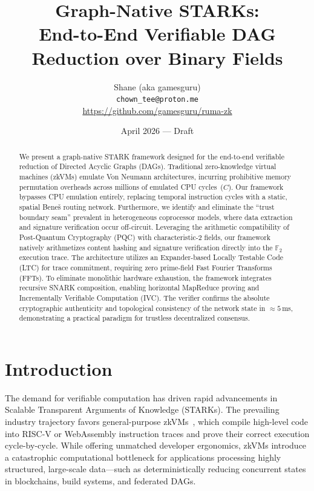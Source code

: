 \documentclass[11pt,a4paper]{article}
\title{%
  \textbf{Graph-Native STARKs:}\\
  End-to-End Verifiable DAG Reduction over Binary Fields
}
\author{%
  Shane (aka gamesguru)\\
  \texttt{chown\_tee@proton.me}\\
  \url{https://github.com/gamesguru/ruma-zk}
}
\date{April 2026 --- Draft}
\begin{document}
\maketitle

\begin{abstract}
We present a graph-native STARK framework designed for the
end-to-end verifiable reduction of Directed Acyclic Graphs (DAGs).
Traditional zero-knowledge virtual machines (zkVMs) emulate Von
Neumann architectures, incurring prohibitive memory permutation
overheads across millions of emulated CPU cycles~($C$).  Our
framework bypasses CPU emulation entirely, replacing temporal
instruction cycles with a static, spatial Bene\v{s} routing
network.  Furthermore, we identify and eliminate the ``trust
boundary seam'' prevalent in heterogeneous coprocessor models,
where data extraction and signature verification occur off-circuit.
Leveraging the arithmetic compatibility of Post-Quantum
Cryptography (PQC) with characteristic-2 fields, our framework
natively arithmetizes content hashing and signature verification
directly into the $\mathbb{F}_2$ execution trace.  The architecture
utilizes an Expander-based Locally Testable Code (LTC) for trace
commitment, requiring zero prime-field Fast Fourier Transforms
(FFTs).  To eliminate monolithic hardware exhaustion, the framework
integrates recursive SNARK composition, enabling horizontal
MapReduce proving and Incrementally Verifiable Computation (IVC).
The verifier confirms the absolute cryptographic authenticity and
topological consistency of the network state in $\approx 5$\,ms,
demonstrating a practical paradigm for trustless decentralized
consensus.
\end{abstract}


\section{Introduction}\label{sec:intro}

The demand for verifiable computation has driven rapid advancements
in Scalable Transparent Arguments of Knowledge (STARKs).  The
prevailing industry trajectory favors general-purpose
zkVMs~\cite{sp1,jolt}, which compile high-level code into RISC-V
or WebAssembly instruction traces and prove their correct execution
cycle-by-cycle.  While offering unmatched developer ergonomics,
zkVMs introduce a catastrophic computational bottleneck for
applications processing highly structured, large-scale data---such
as deterministically reducing concurrent states in blockchains,
build systems, and federated DAGs.
\end{document}

